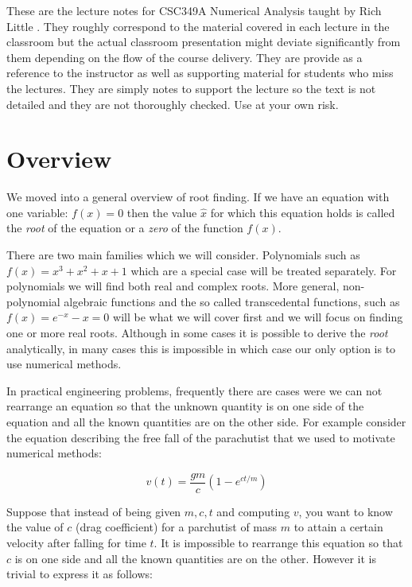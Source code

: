\documentclass [titlepage,12pt,letter] {article}
\begin{document}
 


These are the lecture notes for CSC349A Numerical Analysis taught by
Rich Little	. They roughly correspond to
the material covered in each lecture in the classroom but the actual
classroom presentation might deviate significantly from them depending
on the flow of the course delivery. They are provide as a reference to
the instructor as well as supporting material for students who miss
the lectures. They are simply notes to support the lecture so the text
is not detailed and they are not thoroughly checked. Use at your own
risk. 

\section{Overview} 

We moved into a general overview of root finding. If we have an
equation with one variable: $f(x) = 0$ then the value $\hat x$ for
which this equation holds is called the {\it root} of the equation or
a {\it zero} of the function $f(x)$.

There are two main families which we will consider. Polynomials such
as $f(x) = x^3 + x^2 +x + 1$ which are a special case will be treated
separately. For polynomials we will find both real and complex
roots. More general, non-polynomial algebraic functions and the so called 
transcedental functions, such as $f(x) = e^{-x} -x = 0$ will be what we will cover first and we will focus on
finding one or more real roots. Although in some cases it is possible
to derive the {\it root} analytically, in many cases this is
impossible in which case our only option is to use numerical methods.

In practical engineering problems, frequently there are cases were we 
can not rearrange an equation so that the unknown quantity is on one
side of the equation and all the known quantities are on the other
side.  For example consider the equation describing the free fall of
the parachutist that we used to motivate numerical methods: 

\begin{equation} 
v(t) = \frac{gm}{c} (1-e^{ct/m}) 
\end{equation}


\noindent 
Suppose that instead of being given $m,c,t$ and computing $v$, you
want to know the value of $c$ (drag coefficient) for a parchutist of
mass $m$ to attain a certain velocity after falling for time $t$. It
is impossible to rearrange this equation so that $c$ is on one side 
and all the known quantities are on the other. However it is trivial 
to express it as follows: 
\end{document}
